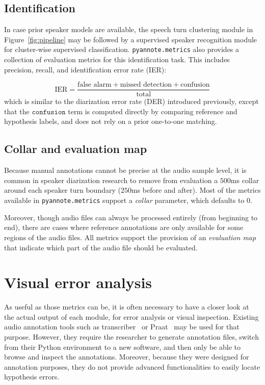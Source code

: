 \documentclass[a4paper]{article}
\newcommand*\metrics{\texttt{\footnotesize{pyannote.metrics}}}
\begin{document}
\subsection{Identification}

In case prior speaker models are available, the speech turn clustering module in Figure~\ref{fig:pipeline} may be followed by a supervised speaker recognition module for cluster-wise supervised classification.
\metrics{} also provides a collection of evaluation metrics for this identification task. This includes precision, recall, and identification error rate (IER):

\begin{equation*}
  \text{IER} = \frac{\text{false alarm} + \text{missed detection} + \text{confusion}}{\text{total}}
\end{equation*}
which is similar to the diarization error rate (DER) introduced previously, except that the $\texttt{confusion}$ term is computed directly by comparing reference and hypothesis labels, and does not rely on a prior one-to-one matching.

\subsection{Collar and evaluation map}

Because manual annotations cannot be precise at the audio sample level, it is common in speaker diarization research to remove from evaluation a $500$ms collar around each speaker turn boundary ($250$ms before and after).
Most of the metrics available in \metrics{} support a \emph{collar} parameter, which defaults to 0.

Moreover, though audio files can always be processed entirely (from beginning to end), there are cases where reference annotations are only available for some regions of the audio files.
All metrics support the provision of an \emph{evaluation map}~\cite{NIST-RT03} that indicate which part of the audio file should be evaluated.

\section{Visual error analysis}
\label{sec:visualization}

As useful as those metrics can be, it is often necessary to have a closer look at the actual output of each module, for error analysis or visual inspection.
Existing audio annotation tools such as transcriber~\cite{transcriber} or Praat~\cite{praat} may be used for that purpose.
However, they require the researcher to generate annotation files, switch from their Python environment to a new software, and then only be able to browse and inspect the annotations.
Moreover, because they were designed for annotation purposes, they do not provide advanced functionalities to easily locate hypothesis errors.
\end{document}
